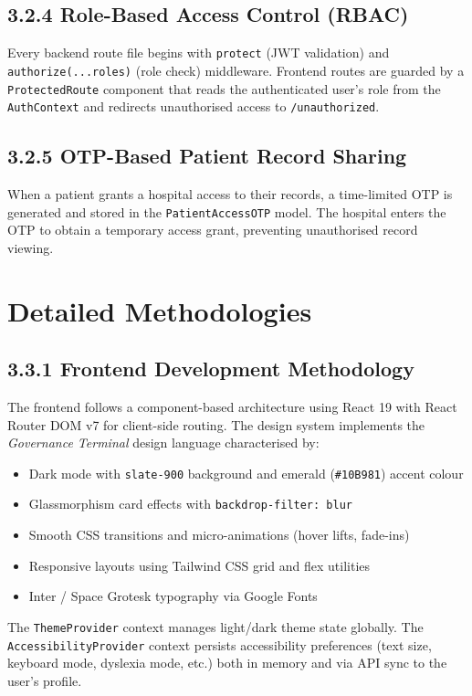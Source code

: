 \documentclass[12pt,a4paper]{report}
\begin{document}
\subsection{3.2.4 Role-Based Access Control (RBAC)}
Every backend route file begins with \texttt{protect} (JWT validation) and \texttt{authorize(...roles)} (role check) middleware. Frontend routes are guarded by a \texttt{ProtectedRoute} component that reads the authenticated user's role from the \texttt{AuthContext} and redirects unauthorised access to \texttt{/unauthorized}.

\subsection{3.2.5 OTP-Based Patient Record Sharing}
When a patient grants a hospital access to their records, a time-limited OTP is generated and stored in the \texttt{PatientAccessOTP} model. The hospital enters the OTP to obtain a temporary access grant, preventing unauthorised record viewing.

\section{Detailed Methodologies}

\subsection{3.3.1 Frontend Development Methodology}

The frontend follows a component-based architecture using React 19 with React Router DOM v7 for client-side routing. The design system implements the \textit{Governance Terminal} design language characterised by:

\begin{itemize}
    \item Dark mode with \texttt{slate-900} background and emerald (\texttt{\#10B981}) accent colour
    \item Glassmorphism card effects with \texttt{backdrop-filter: blur}
    \item Smooth CSS transitions and micro-animations (hover lifts, fade-ins)
    \item Responsive layouts using Tailwind CSS grid and flex utilities
    \item Inter / Space Grotesk typography via Google Fonts
\end{itemize}

The \texttt{ThemeProvider} context manages light/dark theme state globally. The \texttt{AccessibilityProvider} context persists accessibility preferences (text size, keyboard mode, dyslexia mode, etc.) both in memory and via API sync to the user's profile.
\end{document}
